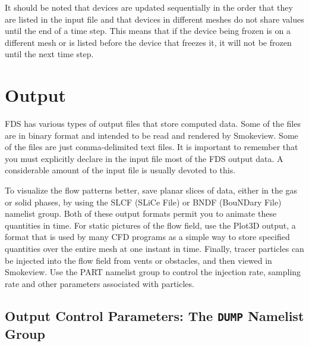 \documentclass[11pt]{book}
\begin{document}
It should be noted that devices are updated sequentially in the order that they are listed in the input file and that devices in different meshes do not share values until the end of a time step.  This means that if the device being frozen is on a different mesh or is listed before the device that freezes it, it will not be frozen until the next time step.






\chapter{Output}
\label{info:outputdata}

FDS has various types of output files that store computed data. Some of the files are in binary format and intended to be read and rendered by Smokeview. Some of the files are just comma-delimited text files. It is important to remember that you must explicitly declare in the input file most of the FDS output data. A considerable amount of the input file is usually devoted to this.

To visualize the flow patterns better, save planar slices of data, either in the gas or solid phases, by using the {\ct SLCF} (SLiCe File) or {\ct BNDF} (BouNDary File) namelist group. Both of these output formats permit you to animate these quantities in time. For static pictures of the flow field, use the Plot3D output, a format that is used by many CFD programs as a simple way to store specified quantities over the entire mesh at one instant in time. Finally, tracer particles can be injected into the flow field from vents or obstacles, and then viewed in Smokeview. Use the {\ct PART} namelist group to control the injection rate, sampling rate and other parameters associated with particles.


\section{Output Control Parameters: The \texorpdfstring{{\tt DUMP}}{DUMP} Namelist Group}
\label{info:DUMP}
\end{document}
